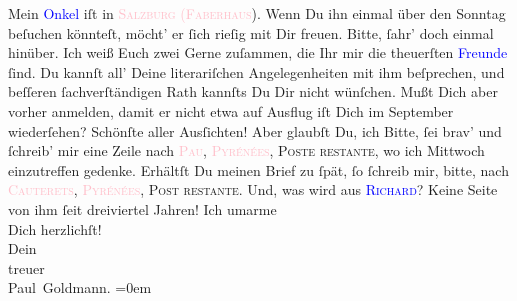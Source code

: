            \pstart
           Mein \textcolor{blue}{Onkel}{} iſt in \textsc{\textcolor{pink}{Salzburg}{}\ledrightnote{\textcolor{pink}{Salzburg}}}{ }\textsc{\textcolor{pink}{(Faberhaus}{}\ledrightnote{\textcolor{pink}{Faberhäuser}}}). {\pb} Wenn Du ihn einmal über den Sonntag
               beſuchen könnteſt, möcht’ er ſich rieſig mit Dir freuen. Bitte, ſahr’ doch einmal
               hinüber. Ich weiß Euch zwei Gerne zuſammen, die Ihr mir die theuerſten \textcolor{blue}{Freunde}{} ſind. Du kannſt all’
               Deine literariſchen Angelegenheiten mit ihm beſprechen, und beſſeren ſachverſtändigen
               Rath kannſts Du Dir {\pb}nicht wünſchen. Mußt Dich aber
               vorher anmelden, damit er nicht etwa auf Ausflug iſt{\dotsfour}\pend
           \pstart
           Dich im September wiederſehen? Schönſte aller Ausſichten!
               Aber glaubſt Du, ich \label{K_L02701-4v}\label{K_L02701-4h}{ }{\dotsfour}\pend
           \pstart
           Bitte, ſei brav’ und ſchreib’ mir eine Zeile nach \textsc{\textcolor{pink}{Pau}{}\ledrightnote{\textcolor{pink}{Pau}}}, \textsc{\textcolor{pink}{Pyrénées}{}\ledrightnote{\textcolor{pink}{Pyrenees}}}, \textsc{Poste restante}, wo ich Mittwoch einzutreffen gedenke. Erhältſt Du {\pb}meinen Brief zu ſpät, ſo ſchreib mir, bitte, nach
                  \textsc{\textcolor{pink}{Cauterets}{}\ledrightnote{\textcolor{pink}{Cauterets}}}, \textsc{\strikeout{\textcolor{pink}{Pyree}{}\ledrightnote{\textcolor{pink}{Pyrenees}}}}{ }\textsc{\textcolor{pink}{Pyrénées}{}\ledrightnote{\textcolor{pink}{Pyrenees}}}, \textsc{Post restante}.\pend
           \pstart
           Und, was wird aus \textsc{\textcolor{blue}{Richard}{}\ledrightnote{\textcolor{blue}{Richard Beer-Hofmann}}}? Keine Seite von ihm ſeit dreiviertel Jahren!\pend
           \pstart
           Ich umarme {\\[\baselineskip]}Dich herzlichſt! {\\[\baselineskip]}Dein {\\[\baselineskip]}treuer {\\[\baselineskip]}\spacefill\mbox{Paul Goldmann.}\pend
           \leftskip=0em{}\endnumbering{}\begin{anhang}\end{anhang}
      